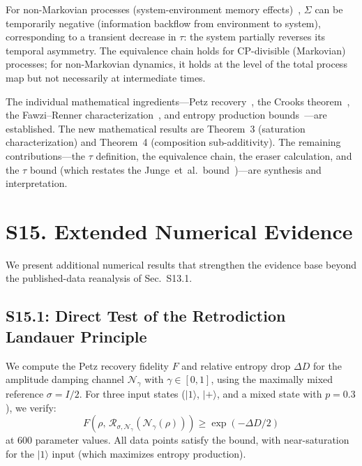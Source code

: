 \documentclass[prl,twocolumn,superscriptaddress,longbibliography]{revtex4-2}
\newcommand{\Petz}{\mathcal{R}}
\newcommand{\chan}{\mathcal{N}}
\newcommand{\ket}[1]{|#1\rangle}
\newcommand{\tauasym}{\tau}
\begin{document}
For non-Markovian processes (system-environment memory
effects)~\cite{Breuer2016}, $\Sigma$ can be temporarily negative
(information backflow from environment to system), corresponding to
a transient decrease in $\tauasym$: the system partially reverses
its temporal asymmetry.
The equivalence chain holds for CP-divisible (Markovian) processes;
for non-Markovian dynamics, it holds at the level of the total
process map but not necessarily at intermediate times.

The individual mathematical
ingredients---Petz recovery~\cite{Petz1988}, the Crooks
theorem~\cite{Crooks1999}, the Fawzi--Renner
characterization~\cite{Fawzi2015}, and entropy production
bounds~\cite{Kolchinsky2017,ReebWolf2014}---are established.
The new mathematical results are Theorem~3 (saturation
characterization) and Theorem~4 (composition sub-additivity).
The remaining contributions---the $\tauasym$ definition,
the equivalence chain, the eraser calculation, and the
$\tauasym$ bound (which restates the Junge~et~al.\
bound~\cite{Junge2018})---are synthesis and interpretation.

\section{S15. Extended Numerical Evidence}
\label{sec:extended_numerical}

We present additional numerical results that strengthen the
evidence base beyond the published-data reanalysis of Sec.~S13.1.

\subsection{S15.1: Direct Test of the Retrodiction Landauer Principle}

We compute the Petz recovery fidelity $F$ and relative entropy drop
$\Delta D$ for the amplitude damping channel $\chan_\gamma$ with
$\gamma \in [0,1]$, using the maximally mixed reference $\sigma = I/2$.
For three input states ($\ket{1}$, $\ket{+}$, and a mixed state with
$p = 0.3$), we verify:
\begin{equation}
F(\rho,\, \Petz_{\sigma,\chan_\gamma}(\chan_\gamma(\rho)))
\geq \exp(-\Delta D / 2)
\end{equation}
at 600 parameter values. All data points satisfy the bound, with
near-saturation for the $\ket{1}$ input (which maximizes entropy
production).
\end{document}
